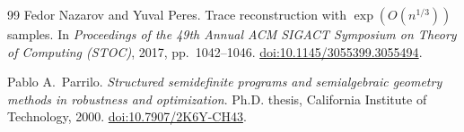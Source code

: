 \begin{thebibliography}{99}
Fedor Nazarov and Yuval Peres.
Trace reconstruction with $\exp(O(n^{1/3}))$ samples.
In \emph{Proceedings of the 49th Annual ACM SIGACT Symposium on Theory
of Computing (STOC)}, 2017, pp.~1042--1046.
\href{https://doi.org/10.1145/3055399.3055494}{doi:10.1145/3055399.3055494}.

Pablo A.~Parrilo.
\emph{Structured semidefinite programs and semialgebraic geometry
methods in robustness and optimization}.
Ph.D. thesis, California Institute of Technology, 2000.
\href{https://doi.org/10.7907/2K6Y-CH43}{doi:10.7907/2K6Y-CH43}.

\end{thebibliography}
